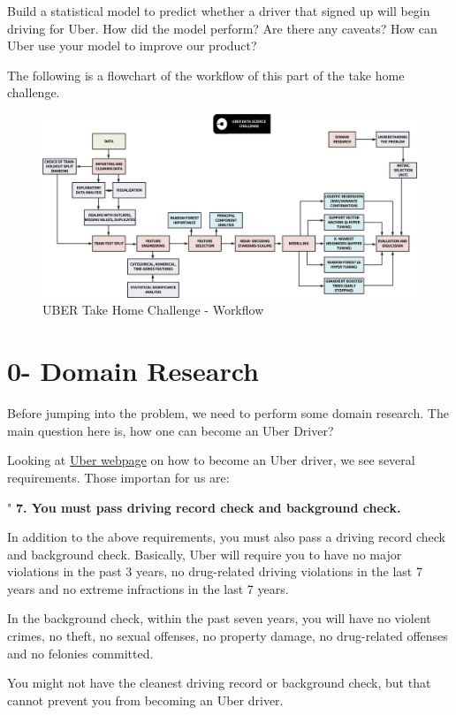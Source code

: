 \documentclass[11pt]{article}
\makeatletter
\def\maxwidth{\ifdim\Gin@nat@width>\linewidth\linewidth
    \else\Gin@nat@width\fi}
\let\Oldincludegraphics\includegraphics
\renewcommand{\includegraphics}[1]{\Oldincludegraphics[width=.8\maxwidth]{#1}}
\makeatother
\begin{document}
Build a statistical model to predict whether a driver that signed up
will begin driving for Uber. How did the model perform? Are there any
caveats? How can Uber use your model to improve our product?

The following is a flowchart of the workflow of this part of the take
home challenge.

\begin{figure}
\centering
\includegraphics{Workflow.png}
\caption{UBER Take Home Challenge - Workflow}
\end{figure}

    \section{0- Domain Research}\label{domain-research}

Before jumping into the problem, we need to perform some domain
research. The main question here is, how one can become an Uber Driver?

Looking at \href{http://www.uberdriverusa.com/}{Uber webpage} on how to
become an Uber driver, we see several requirements. Those importan for
us are:

" \textbf{7. You must pass driving record check and background check.}

In addition to the above requirements, you must also pass a driving
record check and background check. Basically, Uber will require you to
have no major violations in the past 3 years, no drug-related driving
violations in the last 7 years and no extreme infractions in the last 7
years.

In the background check, within the past seven years, you will have no
violent crimes, no theft, no sexual offenses, no property damage, no
drug-related offenses and no felonies committed.

You might not have the cleanest driving record or background check, but
that cannot prevent you from becoming an Uber driver.
\end{document}
